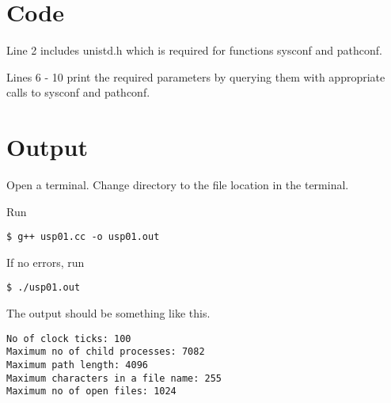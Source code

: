 \section{Code}



Line 2 includes unistd.h which is required for functions sysconf and pathconf.

Lines 6 - 10 print the required parameters by querying them with appropriate calls to sysconf and pathconf.

\section{Output}

Open a terminal. Change directory to the file location in the terminal.

Run
\begin{lstlisting}[style=shell-command]
$ g++ usp01.cc -o usp01.out
\end{lstlisting}

If no errors, run
\begin{lstlisting}[style=shell-command]
$ ./usp01.out
\end{lstlisting}

The output should be something like this.
\begin{lstlisting}[style=shell-output]
No of clock ticks: 100
Maximum no of child processes: 7082
Maximum path length: 4096
Maximum characters in a file name: 255
Maximum no of open files: 1024
\end{lstlisting}
